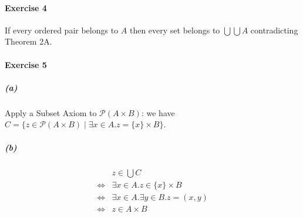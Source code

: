 \documentclass{report}
\begin{document}
    \paragraph{Exercise 4}
    If every ordered pair belongs to $A$ then every set belongs to $\bigcup \bigcup A$ contradicting
    Theorem 2A.

    \paragraph{Exercise 5}
    \subparagraph{(a)}
    Apply a Subset Axiom to $\mathcal{P}(A \times B)$: we have 
    $C = \{ z \in \mathcal{P}(A \times B) \mid \exists x \in A. z = \{x\} \times B \}$.
    \subparagraph{(b)}
    \begin{align*}
        & z \in \bigcup C \\
        \Leftrightarrow & \exists x \in A. z \in \{x\} \times B \\
        \Leftrightarrow & \exists x \in A. \exists y \in B. z = (x,y) \\
        \Leftrightarrow & z \in A \times B
    \end{align*}
\end{document}

